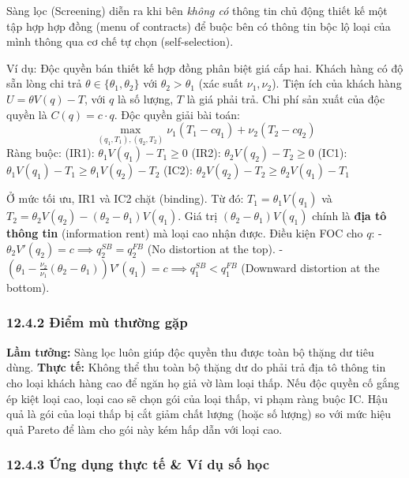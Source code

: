 \documentclass[
]{article}
\begin{document}
Sàng lọc (Screening) diễn ra khi bên \emph{không có} thông tin chủ động
thiết kế một tập hợp hợp đồng (menu of contracts) để buộc bên có thông
tin bộc lộ loại của mình thông qua cơ chế tự chọn (self-selection).

Ví dụ: Độc quyền bán thiết kế hợp đồng phân biệt giá cấp hai. Khách hàng
có độ sẵn lòng chi trả \(\theta \in \{\theta_1, \theta_2\}\) với
\(\theta_2 > \theta_1\) (xác suất \(\nu_1, \nu_2\)). Tiện ích của khách
hàng \(U = \theta V(q) - T\), với \(q\) là số lượng, \(T\) là giá phải
trả. Chi phí sản xuất của độc quyền là \(C(q) = c \cdot q\). Độc quyền
giải bài toán:
\[ \max_{(q_1, T_1), (q_2, T_2)} \nu_1(T_1 - c q_1) + \nu_2(T_2 - c q_2) \]
Ràng buộc: (IR1): \(\theta_1 V(q_1) - T_1 \ge 0\) (IR2):
\(\theta_2 V(q_2) - T_2 \ge 0\) (IC1):
\(\theta_1 V(q_1) - T_1 \ge \theta_1 V(q_2) - T_2\) (IC2):
\(\theta_2 V(q_2) - T_2 \ge \theta_2 V(q_1) - T_1\)

Ở mức tối ưu, IR1 và IC2 chặt (binding). Từ đó:
\(T_1 = \theta_1 V(q_1)\) và
\(T_2 = \theta_2 V(q_2) - (\theta_2 - \theta_1)V(q_1)\). Giá trị
\((\theta_2 - \theta_1)V(q_1)\) chính là \textbf{địa tô thông tin}
(information rent) mà loại cao nhận được. Điều kiện FOC cho \(q\): -
\(\theta_2 V'(q_2) = c \implies q_2^{SB} = q_2^{FB}\) (No distortion at
the top). -
\(\left( \theta_1 - \frac{\nu_2}{\nu_1}(\theta_2 - \theta_1) \right) V'(q_1) = c \implies q_1^{SB} < q_1^{FB}\)
(Downward distortion at the bottom).

\subsubsection{12.4.2 Điểm mù thường
gặp}\label{ux111iux1ec3m-muxf9-thux1b0ux1eddng-gux1eb7p-3}

\textbf{Lầm tưởng:} Sàng lọc luôn giúp độc quyền thu được toàn bộ thặng
dư tiêu dùng. \textbf{Thực tế:} Không thể thu toàn bộ thặng dư do phải
trả địa tô thông tin cho loại khách hàng cao để ngăn họ giả vờ làm loại
thấp. Nếu độc quyền cố gắng ép kiệt loại cao, loại cao sẽ chọn gói của
loại thấp, vi phạm ràng buộc IC. Hậu quả là gói của loại thấp bị cắt
giảm chất lượng (hoặc số lượng) so với mức hiệu quả Pareto để làm cho
gói này kém hấp dẫn với loại cao.

\subsubsection{12.4.3 Ứng dụng thực tế \& Ví dụ số
học}\label{ux1ee9ng-dux1ee5ng-thux1ef1c-tux1ebf-vuxed-dux1ee5-sux1ed1-hux1ecdc-3}
\end{document}
